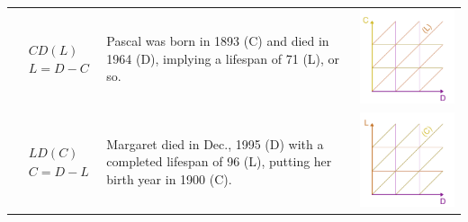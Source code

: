 \documentclass[12pt,oneside,a4paper]{article} %
\begin{document}
\begin{longtable}{m{}L{0.4\textwidth}m{0.2\textwidth}}
  \\
  $$\begin{aligned}
    &CD(L) \\
    &L = D - C
  \end{aligned}$$ &
  Pascal was born in 1893 (C) and died in 1964 (D), implying a lifespan of 71 (L), or so. &
  \includegraphics[scale=.5]{Figures/DiagramTable/CD_rt.pdf} %
  \\
  $$\begin{aligned}
    &LD(C) \\
    &C = D - L
  \end{aligned}$$ &
  Margaret died in Dec., 1995 (D) with a completed lifespan of 96 (L), putting her birth year in 1900 (C). &
  \includegraphics[scale=.5]{Figures/DiagramTable/LD_rt.pdf} %
  \\
  \midrule

\end{longtable}
\end{document}
